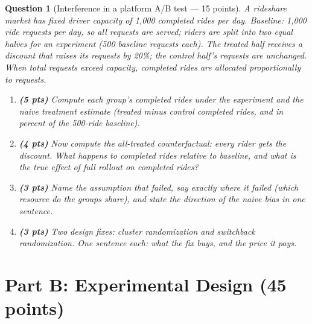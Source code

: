 \documentclass[11pt]{article}
\newtheorem{question}{Question}
\begin{document}
\begin{question}[Interference in a platform A/B test --- 15 points]
A rideshare market has fixed driver capacity of 1{,}000 completed rides
per day. Baseline: 1{,}000 ride requests per day, so all requests are
served; riders are split into two equal halves for an experiment
(500 baseline requests each). The treated half receives a discount that
raises its requests by 20\%; the control half's requests are unchanged.
When total requests exceed capacity, completed rides are allocated
proportionally to requests.

\begin{enumerate}[label=(\alph*)]
  \item \textbf{(5 pts)} Compute each group's completed rides under the
        experiment and the naive treatment estimate (treated minus
        control completed rides, and in percent of the 500-ride
        baseline).
  \item \textbf{(4 pts)} Now compute the all-treated counterfactual:
        every rider gets the discount. What happens to completed rides
        relative to baseline, and what is the true effect of full
        rollout on completed rides?
  \item \textbf{(3 pts)} Name the assumption that failed, say exactly
        where it failed (which resource do the groups share), and state
        the direction of the naive bias in one sentence.
  \item \textbf{(3 pts)} Two design fixes: cluster randomization and
        switchback randomization. One sentence each: what the fix buys,
        and the price it pays.
\end{enumerate}
\end{question}

\section*{Part B: Experimental Design (45 points)}
\end{document}
